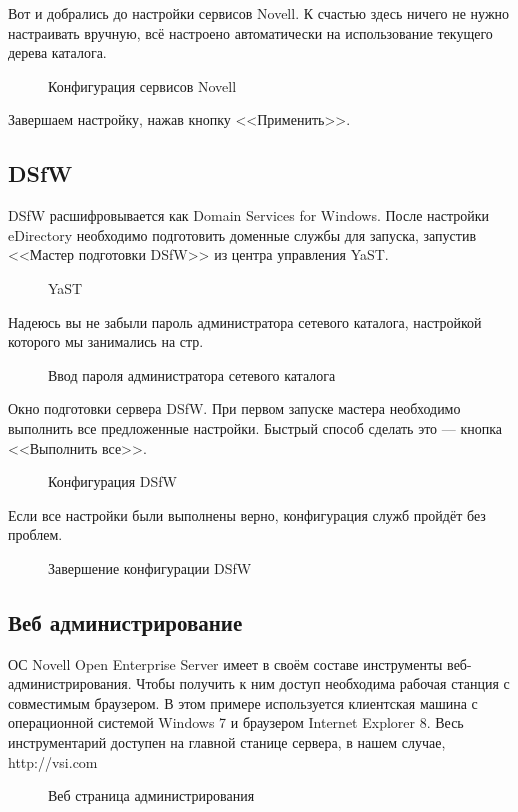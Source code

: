 Вот и добрались до настройки сервисов Novell. К счастью здесь ничего не нужно настраивать вручную, всё настроено автоматически на использование текущего дерева каталога.
\begin{figure}[H]
\caption{Конфигурация сервисов Novell}
\end{figure}
Завершаем настройку, нажав кнопку <<Применить>>.
\clearpage

\subsection{DSfW}
DSfW расшифровывается как Domain Services for Windows. После настройки eDirectory необходимо подготовить доменные службы для запуска, запустив <<Мастер подготовки DSfW>> из центра управления YaST.
\begin{figure}[H]
\caption{YaST}
\end{figure}
\clearpage

Надеюсь вы не забыли пароль администратора сетевого каталога, настройкой которого мы занимались на стр.~\pageref{sec:eDirpass}
\begin{figure}[H]
\caption{Ввод пароля администратора сетевого каталога}
\end{figure}
\clearpage

Окно подготовки сервера DSfW. При первом запуске мастера необходимо выполнить все предложенные настройки. Быстрый способ сделать это --- кнопка <<Выполнить все>>.
\begin{figure}[H]
\caption{Конфигурация DSfW}
\end{figure}
\clearpage

Если все настройки были выполнены верно, конфигурация служб пройдёт без проблем.
\begin{figure}[H]
\caption{Завершение конфигурации DSfW}
\end{figure}
\clearpage

\subsection{Веб администрирование}
ОС \foreignlanguage{english}{Novell Open Enterprise Server} имеет в своём составе инструменты веб-администрирования. Чтобы получить к ним доступ необходима рабочая станция с совместимым браузером. В этом примере используется клиентская машина с операционной системой \foreignlanguage{english}{Windows 7} и браузером \foreignlanguage{english}{Internet Explorer 8}. Весь инструментарий доступен на главной станице сервера, в нашем случае, http://vsi.com
\begin{figure}[H]
\caption{Веб страница администрирования}
\end{figure}
\clearpage

